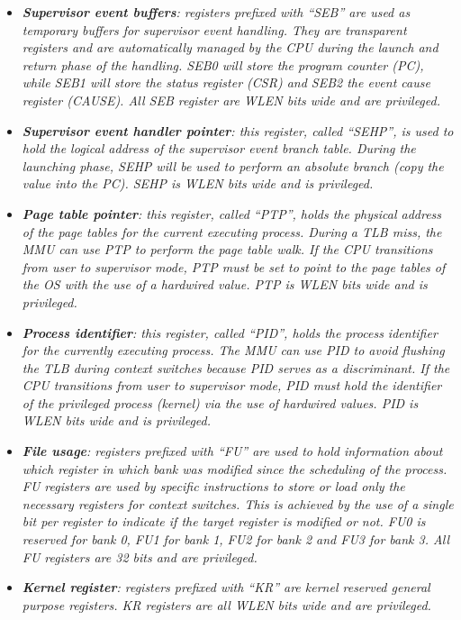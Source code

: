 \begin{itemize}
                \item \textit{\textbf{Supervisor event buffers}: registers prefixed with ``SEB'' are used as temporary buffers for supervisor event handling. They are transparent registers and are automatically managed by the CPU during the launch and return phase of the handling. SEB0 will store the program counter (PC), while SEB1 will store the status register (CSR) and SEB2 the event cause register (CAUSE). All SEB register are WLEN bits wide and are privileged.}

                \item \textit{\textbf{Supervisor event handler pointer}: this register, called ``SEHP'', is used to hold the logical address of the supervisor event branch table. During the launching phase, SEHP will be used to perform an absolute branch (copy the value into the PC). SEHP is WLEN bits wide and is privileged.}

                \item \textit{\textbf{Page table pointer}: this register, called ``PTP'', holds the physical address of the page tables for the current executing process. During a TLB miss, the MMU can use PTP to perform the page table walk. If the CPU transitions from user to supervisor mode, PTP must be set to point to the page tables of the OS with the use of a hardwired value. PTP is WLEN bits wide and is privileged.}

                \item \textit{\textbf{Process identifier}: this register, called ``PID'', holds the process identifier for the currently executing process. The MMU can use PID to avoid flushing the TLB during context switches because PID serves as a discriminant. If the CPU transitions from user to supervisor mode, PID must hold the identifier of the privileged process (kernel) via the use of hardwired values. PID is WLEN bits wide and is privileged.}


                \item \textit{\textbf{File usage}: registers prefixed with ``FU'' are used to hold information about which register in which bank was modified since the scheduling of the process. FU registers are used by specific instructions to store or load only the necessary registers for context switches. This is achieved by the use of a single bit per register to indicate if the target register is modified or not. FU0 is reserved for bank 0, FU1 for bank 1, FU2 for bank 2 and FU3 for bank 3. All FU registers are 32 bits and are privileged.}

                \item \textit{\textbf{Kernel register}: registers prefixed with ``KR'' are kernel reserved general purpose registers. KR registers are all WLEN bits wide and are privileged.}

            \end{itemize}

